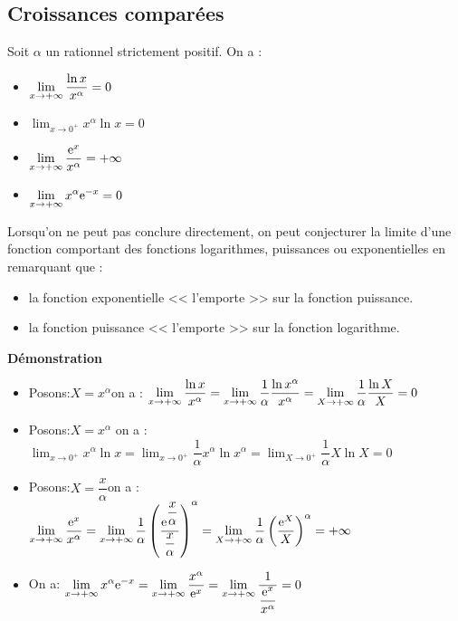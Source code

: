 \subsection{Croissances comparées}
\begin{property}
Soit $\alpha $ un rationnel    strictement positif.  On a :  
\begin{itemize}
\item  $ \displaystyle\lim_{x \to +\infty} \dfrac{\ln x}{x^{\alpha}}=0$ 

\item  $\displaystyle \lim_{x \to 0^{+}} x^{\alpha}\ln x=0$

 \item  $\displaystyle \lim_{x \to +\infty} \frac{\mathrm{e}^{x}}{x^{\alpha}}=+\infty$
 
 \item  $\displaystyle \lim_{x \to +\infty} x^{\alpha}\mathrm{e}^{-x}=0$ 
\end{itemize}
\end{property}
\begin{remark}
Lorsqu'on ne peut pas conclure directement, on peut conjecturer la limite d'une fonction comportant des  fonctions logarithmes, puissances ou exponentielles en remarquant que :
\begin{itemize}
\item la fonction exponentielle <<  l'emporte >> sur la fonction puissance.
\item la fonction puissance <<  l'emporte >> sur la fonction logarithme.
\end{itemize}
\end{remark}


\textbf{Démonstration}
\begin{itemize}
\item Posons:\;$ X=x^{\alpha} $\quad on a :\;    $ \displaystyle\lim_{x \to +\infty} \dfrac{\ln x}{x^{\alpha}}  =\displaystyle \lim_{x \to +\infty} \dfrac{1}{\alpha}\dfrac{\ln x^{\alpha}}{x^{\alpha}} =\displaystyle\lim_{X \to +\infty}\dfrac{1}{\alpha} \dfrac{\ln X}{X}=0$

\item Posons:\;$ X=x^{\alpha} $ on a :
\;$ \displaystyle\lim_{x \to 0^{+}} x^{\alpha}\ln x=\displaystyle\lim_{x \to 0^{+}}\dfrac{1}{\alpha} x^{\alpha}\ln x^{\alpha} =\displaystyle\lim_{X \to 0^{+}} \dfrac{1}{\alpha}X\ln X=0$ 
\item  Posons:\;$ X=\dfrac{x}{\alpha} $\quad on a :                                   \; $ \displaystyle\lim_{x \to +\infty} \dfrac{\mathrm{e}^{x}}{x^{\alpha}}= \displaystyle \lim_{x \to +\infty} \dfrac{1}{\alpha}\left(\dfrac{\mathrm{e}^{\dfrac{x}{\alpha}}}{\dfrac{x}{\alpha}}\right)^{\alpha} =\lim_{X\to +\infty} \dfrac{1}{\alpha}\left(\dfrac{\mathrm{e}^{X}}{X}\right)^{\alpha}= +\infty$
\item On a:\; $ \displaystyle\lim_{x \to +\infty} x^{\alpha}\mathrm{e}^{-x}=\displaystyle\lim_{x \to +\infty}\dfrac{x^{\alpha}}{\mathrm{e}^{x}} =\displaystyle\lim_{x \to +\infty}\dfrac{1}{\dfrac{\mathrm{e}^{x}}{x^{\alpha}}}= 0$

\end{itemize}


